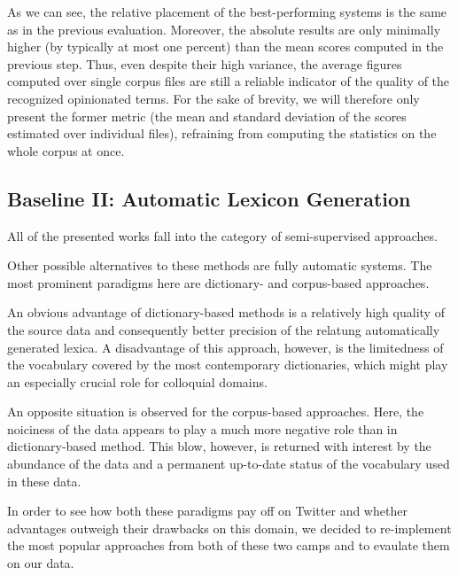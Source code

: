 As we can see, the relative placement of the best-performing systems
is the same as in the previous evaluation.  Moreover, the absolute
results are only minimally higher (by typically at most one percent)
than the mean scores computed in the previous step.  Thus, even
despite their high variance, the average figures computed over single
corpus files are still a reliable indicator of the quality of the
recognized opinionated terms.  For the sake of brevity, we will
therefore only present the former metric (the mean and standard
deviation of the scores estimated over individual files), refraining
from computing the statistics on the whole corpus at once.

\subsection{Baseline II: Automatic Lexicon Generation}

All of the presented works fall into the category of semi-supervised
approaches.


Other possible alternatives to these methods are fully automatic
systems.  The most prominent paradigms here are dictionary- and
corpus-based approaches.

An obvious advantage of dictionary-based methods is a relatively high
quality of the source data and consequently better precision of the
relatung automatically generated lexica.  A disadvantage of this
approach, however, is the limitedness of the vocabulary covered by the
most contemporary dictionaries, which might play an especially crucial
role for colloquial domains.

An opposite situation is observed for the corpus-based approaches.
Here, the noiciness of the data appears to play a much more negative
role than in dictionary-based method. This blow, however, is returned
with interest by the abundance of the data and a permanent up-to-date
status of the vocabulary used in these data.

In order to see how both these paradigms pay off on Twitter and
whether advantages outweigh their drawbacks on this domain, we decided
to re-implement the most popular approaches from both of these two
camps and to evaulate them on our data.

